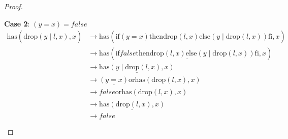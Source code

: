 \documentclass[12pt, a4paper]{article}
\newcommand{\rel}[1]{\mathrel{#1}}
\newcommand{\rmx}[1]{\mathrm{#1}}
\newcommand{\larrow}{\longrightarrow}
\newcommand{\under}{\underline}
\begin{document}
\begin{proof}
\begin{description}
\textbf{Case 2}: $(y = x) = false$
\begin{align*}
\rmx{has}(\under{\rmx{drop}(y \rel{|} l, x)}, x)
	&\larrow \rmx{has}(\rel{\rmx{if}} \under{(y = x)} \rel{\rmx{then}} \rmx{drop}(l, x) \rel{\rmx{else}} (y \rel{|} \rmx{drop}(l, x)) \rel{\rmx{fi}}, x) \tag{by drop2} \\
	&\larrow \rmx{has}(\under{\rel{\rmx{if}} false \rel{\rmx{then}} \rmx{drop}(l, x) \rel{\rmx{else}} (y \rel{|} \rmx{drop}(l, x)) \rel{\rmx{fi}}}, x) \tag{by case splitting} \\
	&\larrow \under{\rmx{has}(y \rel{|} \rmx{drop}(l, x), x)} \tag{by if2} \\
	&\larrow \under{(y = x)} \rel{\rmx{or}} \rmx{has}(\rmx{drop}(l, x), x) \tag{by has2} \\
	&\larrow \under{false \rel{\rmx{or}} \rmx{has}(\rmx{drop}(l, x), x)} \tag{by case splitting} \\
	&\larrow \under{\rmx{has}(\rmx{drop}(l, x), x)} \tag{by or} \\
	&\larrow false \tag{by IH}
\end{align*}

\end{description}

\end{proof}
\end{document}
